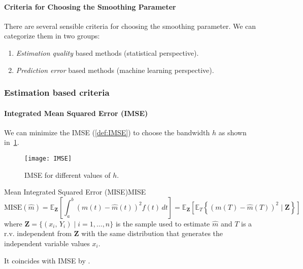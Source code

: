\paragraph{Criteria for Choosing the Smoothing Parameter}
There are several sensible criteria for choosing the smoothing parameter. We can
categorize them in two groups:
\begin{enumerate}
	\item \emph{Estimation quality} based methods (statistical perspective).
	\item \emph{Prediction error} based methods (machine learning perspective).
\end{enumerate}

\subsubsection{Estimation based criteria}

\paragraph{Integrated Mean Squared Error (IMSE)} We can minimize the
IMSE (\ref{def:IMSE}) to choose the bandwidth $h$ as shown in~\cref{fig:IMSE}.
\begin{figure}[H]
	\texttt{[image: IMSE]}
	\caption{IMSE for different values of $h$.}%
	\label{fig:IMSE}
\end{figure}

\begin{definition}{Mean Integrated Squared Error (MISE)}{MISE}
	\begin{equation*}
		\text{MISE}(\hat m) = \mathds{E}_{\boldsymbol Z} \left[
			\int_a^b \left( m(t) - \hat m(t) \right)^2 f(t) \, dt
			\right] =
		\mathds{E}_{\boldsymbol Z} \left[
			\mathds{E}_T \left\{
			\left( m(T) - \hat m(T) \right)^2 \mid \boldsymbol Z
			\right\}
			\right]
	\end{equation*}
	where $\boldsymbol Z = \{(x_i,\, Y_i) \mid i = 1,\ldots,n\}$ is the sample
	used to estimate $\hat m$ and $T$ is a r.v. independent from $\boldsymbol Z$
	with the same distribution that generates the independent variable values $x_i$.
	\tcblower
	\begin{note}
		It coincides with IMSE by .
	\end{note}
\end{definition}

